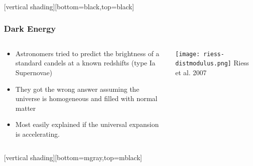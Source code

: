 \documentclass{beamer}
\begin{document}
{
    [vertical shading][bottom=black,top=black]

    \frame
    {
        \frametitle{Dark Energy}

        \begin{columns}
            \begin{column}{0.4\textwidth}    
                \begin{itemize}

                    \item Astronomers tried to predict the brightness of a
                        standard candels at a known redshifts (type Ia
                        Supernovae)

                    \item They got the wrong answer assuming the universe is
                        homogeneous and filled with normal matter

                    \item Most easily explained if the universal expansion is accelerating.

                \end{itemize}
            \end{column}
            \begin{column}{0.6\textwidth}
                \begin{center}
                    \texttt{[image: riess-distmodulus.png]}
                    \newline
                    {\tiny Riess et al. 2007}
                \end{center}
            \end{column}
        \end{columns}
    }

    [vertical shading][bottom=mgray,top=mblack]
}
\end{document}
